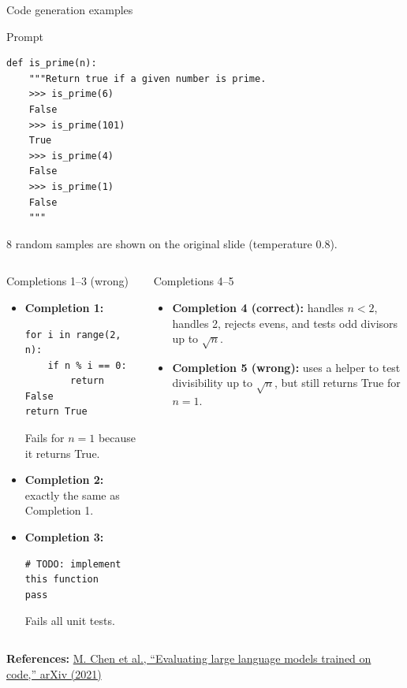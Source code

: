 \documentclass[aspectratio=43,9pt]{beamer}
\newcommand{\srclink}[2]{\href{#2}{\textcolor{black!68}{#1}}}
\newcommand{\refline}[2][References]{%
  \vfill
  {\raggedright\fontsize{5.1}{5.5}\selectfont\color{black!68}\textbf{#1:} #2\par}%
}
\newcommand{\srcChen}{\srclink{M. Chen et al., ``Evaluating large language models trained on code,'' arXiv (2021)}{https://arxiv.org/abs/2107.03374}}
\begin{document}
\begin{frame}[fragile]{Code generation examples}
\tiny
\begin{block}{Prompt}
\begin{lstlisting}
def is_prime(n):
    """Return true if a given number is prime.
    >>> is_prime(6)
    False
    >>> is_prime(101)
    True
    >>> is_prime(4)
    False
    >>> is_prime(1)
    False
    """
\end{lstlisting}
8 random samples are shown on the original slide (temperature 0.8).
\end{block}

\begin{columns}[T,totalwidth=\textwidth]
\begin{block}{Completions 1--3 (wrong)}
\begin{itemize}
  \item \textbf{Completion 1:}
\begin{lstlisting}
for i in range(2, n):
    if n % i == 0:
        return False
return True
\end{lstlisting}
Fails for \(n=1\) because it returns True.
  \item \textbf{Completion 2:} exactly the same as Completion 1.
  \item \textbf{Completion 3:}
\begin{lstlisting}
# TODO: implement this function
pass
\end{lstlisting}
Fails all unit tests.
\end{itemize}
\end{block}

\begin{block}{Completions 4--5}
\begin{itemize}
  \item \textbf{Completion 4 (correct):}
    handles \(n<2\), handles 2, rejects evens, and tests odd divisors up to \(\sqrt n\).
  \item \textbf{Completion 5 (wrong):}
    uses a helper to test divisibility up to \(\sqrt n\), but still returns True for \(n=1\).
\end{itemize}

\end{block}
\end{columns}

\refline{\srcChen}
\end{frame}
\end{document}
